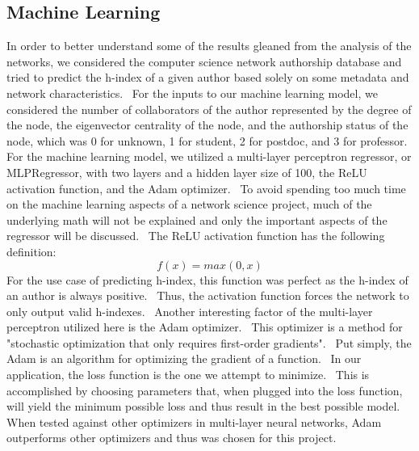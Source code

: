 \documentclass[9pt,twocolumn,twoside]{pnas-new}
\begin{document}
\subsection*{Machine Learning}
In order to better understand some of the results gleaned from the analysis of the networks, we considered the computer science network authorship database and tried to predict the h-index of a given author based solely on some metadata and network characteristics.  For the inputs to our machine learning model, we considered the number of collaborators of the author represented by the degree of the node, the eigenvector centrality of the node, and the authorship status of the node, which was 0 for unknown, 1 for student, 2 for postdoc, and 3 for professor.  For the machine learning model, we utilized a multi-layer perceptron regressor, or MLPRegressor, with two layers and a hidden layer size of 100, the ReLU activation function, and the Adam optimizer.  To avoid spending too much time on the machine learning aspects of a network science project, much of the underlying math will not be explained and only the important aspects of the regressor will be discussed.  The ReLU activation function has the following definition: 
$$f(x) = max(0,x)$$
\noindent For the use case of predicting h-index, this function was perfect as the h-index of an author is always positive.  Thus, the activation function forces the network to only output valid h-indexes.  Another interesting factor of the multi-layer perceptron utilized here is the Adam optimizer.  This optimizer is a method for "stochastic optimization that only requires first-order gradients"\cite{kingma2017adammethodstochasticoptimization}.  Put simply, the Adam is an algorithm for optimizing the gradient of a function.  In our application, the loss function is the one we attempt to minimize.  This is accomplished by choosing parameters that, when plugged into the loss function, will yield the minimum possible loss and thus result in the best possible model.  When tested against other optimizers in multi-layer neural networks, Adam outperforms other optimizers and thus was chosen for this project\cite{kingma2017adammethodstochasticoptimization}. 
\end{document}
